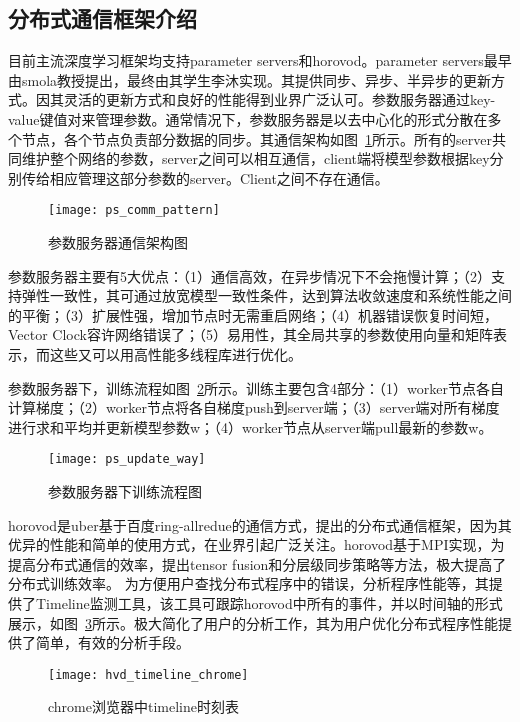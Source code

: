 \subsection{分布式通信框架介绍}
目前主流深度学习框架均支持parameter servers和horovod。parameter servers最早由smola教授提出，最终由其学生李沐实现。其提供同步、异步、半异步的更新方式。因其灵活的更新方式和良好的性能得到业界广泛认可。参数服务器通过key-value键值对来管理参数。通常情况下，参数服务器是以去中心化的形式分散在多个节点，各个节点负责部分数据的同步。其通信架构如图~\ref{fig:ps_comm_pattern}所示。所有的server共同维护整个网络的参数，server之间可以相互通信，client端将模型参数根据key分别传给相应管理这部分参数的server。Client之间不存在通信。

\begin{figure}[htp]
\centering
\texttt{[image: ps\_comm\_pattern]}
\caption{参数服务器通信架构图}
\label{fig:ps_comm_pattern}
\end{figure}
参数服务器主要有5大优点：（1）通信高效，在异步情况下不会拖慢计算；（2）支持弹性一致性，其可通过放宽模型一致性条件，达到算法收敛速度和系统性能之间的平衡；（3）扩展性强，增加节点时无需重启网络；（4）机器错误恢复时间短，Vector Clock容许网络错误了；（5）易用性，其全局共享的参数使用向量和矩阵表示，而这些又可以用高性能多线程库进行优化。

参数服务器下，训练流程如图~\ref{fig:ps_update_way}所示。训练主要包含4部分：（1）worker节点各自计算梯度；（2）worker节点将各自梯度push到server端；（3）server端对所有梯度进行求和平均并更新模型参数w；（4）worker节点从server端pull最新的参数w。

\begin{figure}[htp]
\centering
\texttt{[image: ps\_update\_way]}
\caption{参数服务器下训练流程图}
\label{fig:ps_update_way}
\end{figure}
horovod是uber基于百度ring-allredue的通信方式，提出的分布式通信框架，因为其优异的性能和简单的使用方式，在业界引起广泛关注。horovod基于MPI实现，为提高分布式通信的效率，提出tensor fusion和分层级同步策略等方法，极大提高了分布式训练效率。 为方便用户查找分布式程序中的错误，分析程序性能等，其提供了Timeline监测工具，该工具可跟踪horovod中所有的事件，并以时间轴的形式展示，如图~\ref{fig:hvd_timeline_chrome}所示。极大简化了用户的分析工作，其为用户优化分布式程序性能提供了简单，有效的分析手段。
\begin{figure}[htp]
\centering
\texttt{[image: hvd\_timeline\_chrome]}
\caption{chrome浏览器中timeline时刻表}
\label{fig:hvd_timeline_chrome}
\end{figure}

